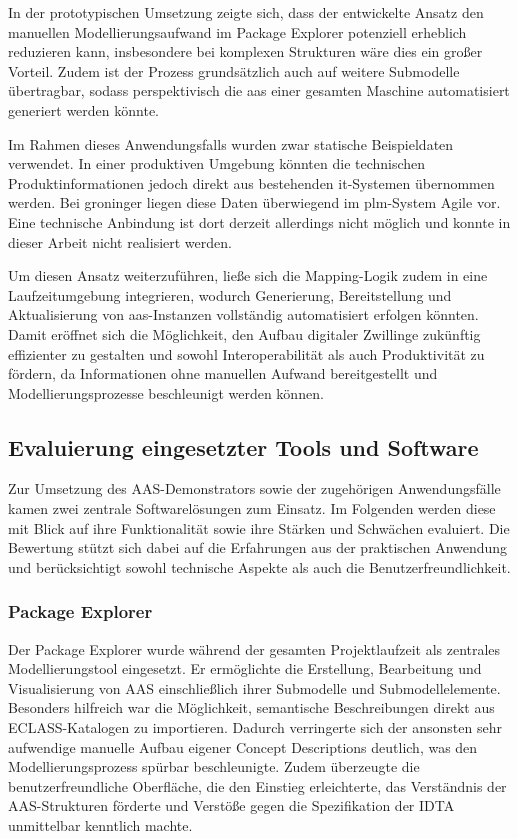 In der prototypischen Umsetzung zeigte sich, dass der entwickelte Ansatz den manuellen Modellierungsaufwand im Package Explorer potenziell erheblich reduzieren kann, insbesondere bei komplexen Strukturen wäre dies ein großer Vorteil. 
Zudem ist der Prozess grundsätzlich auch auf weitere Submodelle übertragbar, sodass perspektivisch die \acs{aas} einer gesamten Maschine automatisiert generiert werden könnte. 

Im Rahmen dieses Anwendungsfalls wurden zwar statische Beispieldaten verwendet. 
In einer produktiven Umgebung könnten die technischen Produktinformationen jedoch direkt aus bestehenden \acs{it}-Systemen übernommen werden. 
Bei groninger liegen diese Daten überwiegend im \acs{plm}-System Agile vor. 
Eine technische Anbindung ist dort derzeit allerdings nicht möglich und konnte in dieser Arbeit nicht realisiert werden.

Um diesen Ansatz weiterzuführen, ließe sich die Mapping-Logik zudem in eine Laufzeitumgebung integrieren, wodurch Generierung, Bereitstellung und Aktualisierung von \acs{aas}-Instanzen vollständig automatisiert erfolgen könnten. 
Damit eröffnet sich die Möglichkeit, den Aufbau digitaler Zwillinge zukünftig effizienter zu gestalten und sowohl Interoperabilität als auch Produktivität zu fördern, da Informationen ohne manuellen Aufwand bereitgestellt und Modellierungsprozesse beschleunigt werden können.

\newpage
\subsection{Evaluierung eingesetzter Tools und Software}
\label{subsec:EvaluierungTools}
Zur Umsetzung des AAS-Demonstrators sowie der zugehörigen Anwendungsfälle kamen zwei zentrale Softwarelösungen zum Einsatz.
Im Folgenden werden diese mit Blick auf ihre Funktionalität sowie ihre Stärken und Schwächen evaluiert.
Die Bewertung stützt sich dabei auf die Erfahrungen aus der praktischen Anwendung und berücksichtigt sowohl technische Aspekte als auch die Benutzerfreundlichkeit.

\subsubsection{Package Explorer}

Der Package Explorer wurde während der gesamten Projektlaufzeit als zentrales Modellierungstool eingesetzt.
Er ermöglichte die Erstellung, Bearbeitung und Visualisierung von AAS einschließlich ihrer Submodelle und Submodellelemente.
Besonders hilfreich war die Möglichkeit, semantische Beschreibungen direkt aus ECLASS-Katalogen zu importieren.
Dadurch verringerte sich der ansonsten sehr aufwendige manuelle Aufbau eigener Concept Descriptions deutlich, was den Modellierungsprozess spürbar beschleunigte.
Zudem überzeugte die benutzerfreundliche Oberfläche, die den Einstieg erleichterte, das Verständnis der AAS-Strukturen förderte und Verstöße gegen die Spezifikation der IDTA unmittelbar kenntlich machte.

